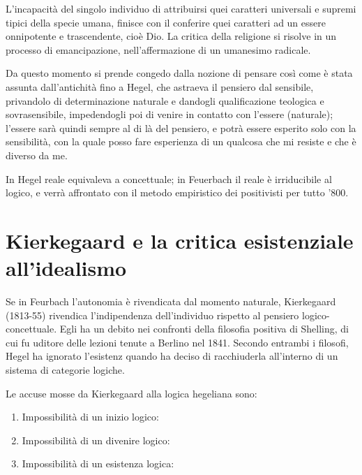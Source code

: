 L'incapacità del singolo individuo di attribuirsi quei caratteri universali e supremi tipici della specie umana, finisce con il conferire quei caratteri ad un essere onnipotente e trascendente, cioè Dio. La critica della religione si risolve in un processo di emancipazione, nell'affermazione di un umanesimo radicale.

Da questo momento si prende congedo dalla nozione di pensare così come è stata assunta dall'antichità fino a Hegel, che astraeva il pensiero dal sensibile, privandolo di determinazione naturale e dandogli qualificazione teologica e sovrasensibile, impedendogli poi di venire in contatto con l'essere (naturale); l'essere sarà quindi sempre al di là del pensiero, e potrà essere esperito solo con la sensibilità, con la quale posso fare esperienza di un qualcosa che mi resiste e che è diverso da me.

In Hegel reale equivaleva a concettuale; in Feuerbach il reale è irriducibile al logico, e verrà affrontato con il metodo empiristico dei positivisti per tutto '800.

\section{Kierkegaard e la critica esistenziale all'idealismo}

Se in Feurbach l'autonomia è rivendicata dal momento naturale, Kierkegaard (1813-55) rivendica l'indipendenza dell'individuo rispetto al pensiero logico-concettuale. Egli ha un debito nei confronti della filosofia positiva di Shelling, di cui fu uditore delle lezioni tenute a Berlino nel 1841. Secondo entrambi i filosofi, Hegel ha ignorato l'esistenz quando ha deciso di racchiuderla all'interno di un sistema di categorie logiche.

Le accuse mosse da Kierkegaard alla logica hegeliana sono:

\begin{enumerate}
	\item Impossibilità di un inizio logico:
	\item Impossibilità di un divenire logico:
	\item Impossibilità di un esistenza logica:
\end{enumerate}

